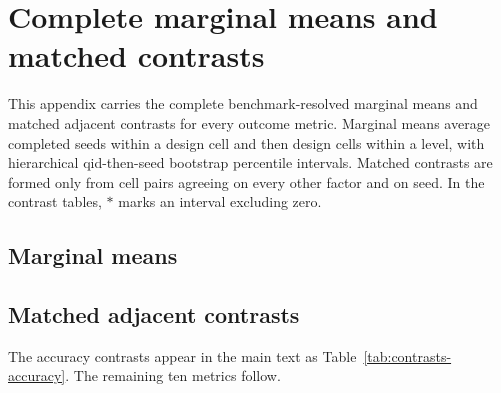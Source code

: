 \section{Complete marginal means and matched contrasts}
\label{app:marginals}

This appendix carries the complete benchmark-resolved marginal means and matched adjacent
contrasts for every outcome metric. Marginal means average completed seeds within a design
cell and then design cells within a level, with hierarchical qid-then-seed bootstrap
percentile intervals. Matched contrasts are formed only from cell pairs agreeing on every
other factor and on seed. In the contrast tables, $\ast$ marks an interval excluding zero.

\subsection{Marginal means}

\clearpage
{}
\clearpage
{}
\clearpage
{}
\clearpage
{}
\clearpage
{}
\clearpage
{}
\clearpage
{}
\clearpage
{}
\clearpage
{}
\clearpage
{}
\clearpage
{}
\clearpage
{}

\clearpage
\subsection{Matched adjacent contrasts}

The accuracy contrasts appear in the main text as Table~\ref{tab:contrasts-accuracy}. The
remaining ten metrics follow.

\clearpage
{}
\clearpage
{}
\clearpage
{}
\clearpage
{}
\clearpage
{}
\clearpage
{}
\clearpage
{}
\clearpage
{}
\clearpage
{}
